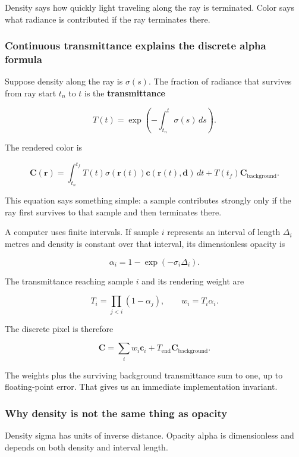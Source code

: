 Density says how quickly light traveling along the ray is terminated. Color says what radiance is contributed if the ray terminates there.

\subsubsection{Continuous transmittance explains the discrete alpha formula}\label{04-visual-computing-ii-ch035-continuous-transmittance-explains-the-discrete-alpha-formula}

Suppose density along the ray is \(\sigma(s)\). The fraction of radiance that survives from ray start \(t_n\) to \(t\) is the \textbf{transmittance}

\[T(t)=\exp\left(-\int_{t_n}^{t}\sigma(s)\,ds\right).\]

The rendered color is

\[\mathbf C(\mathbf r)=\int_{t_n}^{t_f}T(t)\sigma(\mathbf r(t))\mathbf c(\mathbf r(t),\mathbf d)\,dt+T(t_f)\mathbf C_{\mathrm{background}}.\]

This equation says something simple: a sample contributes strongly only if the ray first survives to that sample and then terminates there.

A computer uses finite intervals. If sample \(i\) represents an interval of length \(\Delta_i\) metres and density is constant over that interval, its dimensionless opacity is

\[\alpha_i=1-\exp(-\sigma_i\Delta_i).\]

The transmittance reaching sample \(i\) and its rendering weight are

\[T_i=\prod_{j<i}(1-\alpha_j),\qquad w_i=T_i\alpha_i.\]

The discrete pixel is therefore

\[\mathbf C=\sum_iw_i\mathbf c_i+T_{\mathrm{end}}\mathbf C_{\mathrm{background}}.\]

The weights plus the surviving background transmittance sum to one, up to floating-point error. That gives us an immediate implementation invariant.

\subsubsection{Why density is not the same thing as opacity}\label{04-visual-computing-ii-ch035-why-density-is-not-the-same-thing-as-opacity}

Density sigma has units of inverse distance. Opacity alpha is dimensionless and depends on both density and interval length.


